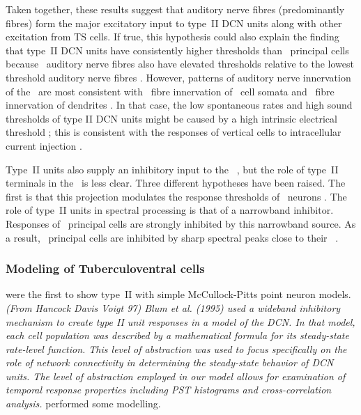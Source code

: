 

Taken together, these results suggest that auditory nerve fibres (predominantly \LSR fibres) form the major excitatory input to type~II DCN units along with other excitation from TS cells.
If true, this hypothesis could also explain the finding that type~II DCN units have consistently higher thresholds than \DCN~principal cells \citep{YoungBrownell:1976} because \LSR~auditory nerve fibres also have elevated thresholds relative to the lowest threshold auditory nerve fibres \citep{Liberman:1978}.
However, patterns of auditory nerve innervation of the \DCN~are most consistent with \HSR~fibre innervation of \TV~cell somata and \LSR~fibre innervation of dendrites \citep{Liberman:1993}.
In that case, the low spontaneous rates and high sound thresholds of type II DCN units might be caused by a high intrinsic electrical threshold \citep{HancockDavisEtAl:1997}; this is consistent with the responses of vertical cells to intracellular current injection \citep{DingVoigt:1997,ZhangOertel:1993b}.


Type~II units also supply an inhibitory input to the \VCN~\citep{WickesbergOertel:1990}, but the role of type~II terminals in the \VCN~is less clear.
Three different hypotheses have been raised.
The first is that this projection modulates the response thresholds of \VCN~neurons \citep{PaoliniClark:1998}.
The role of type~II units in spectral processing is that of a narrowband inhibitor. Responses of \DCN~principal cells are strongly inhibited by this narrowband source.
As a result, \DCN~principal cells are inhibited by sharp spectral peaks close to their \BF~\citep{SpirouDavisEtAl:1999}.



\subsubsection{Modeling of Tuberculoventral cells}

\citet{ArleKim:1991a} were the first to show type~II \EIRA  with simple McCullock-Pitts point neuron models.
\textit{(From Hancock Davis Voigt 97) Blum et al. (1995) used a wideband inhibitory   mechanism to create type II unit responses in a model of the DCN. In that   model, each cell population was described by a mathematical formula for its   steady-state rate-level function. This level of abstraction was used to focus   specifically on the role of network connectivity in determining the   steady-state behavior of DCN units. The level of abstraction employed in our   model allows for examination of temporal response properties including PST   histograms and cross-correlation analysis.}
\citep{DunnVetterEtAl:1996} performed some modelling.


